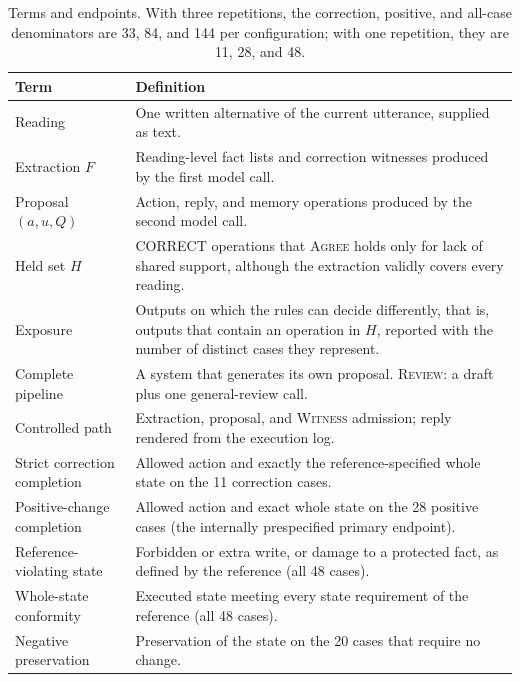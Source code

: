 \documentclass[acmsmall,review]{acmart}
\newcommand{\agree}{\textsc{Agree}}
\newcommand{\witness}{\textsc{Witness}}
\newcommand{\review}{\textsc{Review}}
\begin{document}
\begin{table}[tbp]
\centering
\caption{Terms and endpoints. With three repetitions, the correction, positive, and all-case denominators are 33, 84, and 144 per configuration; with one repetition, they are 11, 28, and 48.}\label{tab:2}
\small
\setlength{\tabcolsep}{3pt}
\begin{tabular}{@{}>{\raggedright\arraybackslash}p{}>{\raggedright\arraybackslash}p{}@{}}
\toprule
\textbf{Term} & \textbf{Definition} \\
\midrule
Reading & One written alternative of the current utterance, supplied as text. \\
Extraction $F$ & Reading-level fact lists and correction witnesses produced by the first model call. \\
Proposal $(a,u,Q)$ & Action, reply, and memory operations produced by the second model call. \\
Held set $H$ & CORRECT operations that \agree{} holds only for lack of shared support, although the extraction validly covers every reading. \\
Exposure & Outputs on which the rules can decide differently, that is, outputs that contain an operation in $H$, reported with the number of distinct cases they represent. \\
Complete pipeline & A system that generates its own proposal. \review{}: a draft plus one general-review call. \\
Controlled path & Extraction, proposal, and \witness{} admission; reply rendered from the execution log. \\
Strict correction completion & Allowed action and exactly the reference-specified whole state on the 11 correction cases. \\
Positive-change completion & Allowed action and exact whole state on the 28 positive cases (the internally prespecified primary endpoint). \\
Reference-violating state & Forbidden or extra write, or damage to a protected fact, as defined by the reference (all 48 cases). \\
Whole-state conformity & Executed state meeting every state requirement of the reference (all 48 cases). \\
Negative preservation & Preservation of the state on the 20 cases that require no change. \\
\bottomrule
\end{tabular}
\end{table}
\end{document}
